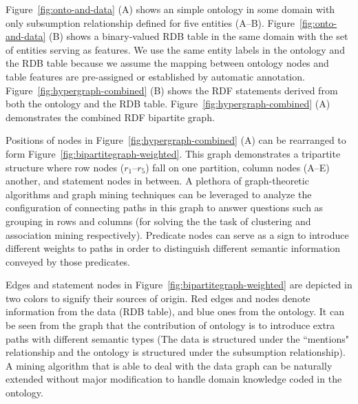 \begin{myexp}
Figure~\ref{fig:onto-and-data} (A) shows an simple ontology in some domain with only subsumption relationship defined for five entities (A--B). Figure~\ref{fig:onto-and-data} (B) shows a binary-valued RDB table in the same domain with the set of entities serving as features. We use the same entity labels in the ontology and the RDB table because we assume the mapping between ontology nodes and table features are pre-assigned or established by automatic annotation. Figure~\ref{fig:hypergraph-combined} (B) shows the RDF statements derived from both the ontology and the RDB table. Figure~\ref{fig:hypergraph-combined} (A) demonstrates the combined RDF bipartite graph.

Positions of nodes in Figure~\ref{fig:hypergraph-combined} (A) can be rearranged to form Figure~\ref{fig:bipartitegraph-weighted}. This graph demonstrates a tripartite structure where row nodes ($r_1$--$r_5$) fall on one partition, column nodes (A--E) another, and statement nodes in between. A plethora of graph-theoretic algorithms and graph mining techniques can be leveraged to analyze the configuration of connecting paths in this graph to answer questions such as grouping in rows and columns (for solving the the task of clustering and association mining respectively). Predicate nodes can serve as a sign to introduce different weights to paths in order to distinguish different semantic information conveyed by those predicates.

Edges and statement nodes in Figure~\ref{fig:bipartitegraph-weighted} are depicted in two colors to signify their sources of origin. Red edges and nodes denote information from the data (RDB table), and blue ones from the ontology. It can be seen from the graph that the contribution of ontology is to introduce extra paths with different semantic types (The data is structured under the ``mentions" relationship and the ontology is structured under the subsumption relationship). A mining algorithm that is able to deal with the data graph can be naturally extended without major modification to handle domain knowledge coded in the ontology.
\end{myexp}

